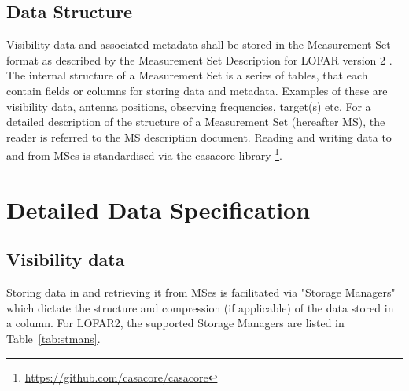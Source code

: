 \documentclass[a4paper,10pt,bibtotoc]{scrartcl}
\begin{document}




\subsection{Data Structure}

Visibility data and associated metadata shall be stored in the Measurement Set format as described by the Measurement Set Description for LOFAR version 2 \cite{ms2.lofar.2022}. The internal structure of a Measurement Set is a series of tables, that each contain fields or columns for storing data and metadata. Examples of these are visibility data, antenna positions, observing frequencies, target(s) etc. For a detailed description of the structure of a Measurement Set (hereafter MS), the reader is referred to the MS description document. Reading and writing data to and from MSes is standardised via the casacore library \footnote{\url{https://github.com/casacore/casacore}}.
\newpage
\section{Detailed Data Specification}
\subsection{Visibility data}
 Storing data in and retrieving it from MSes is facilitated via "Storage Managers" which dictate the structure and compression (if applicable) of the data stored in a column. For LOFAR2, the supported Storage Managers are listed in Table~\ref{tab:stmans}.
\end{document}
